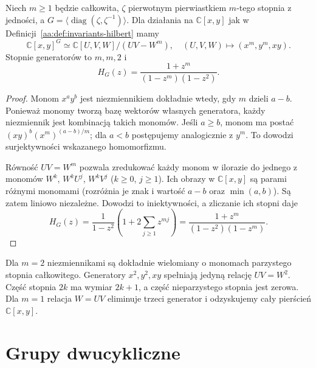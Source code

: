\begin{twierdzenie}
\label{aa:tw:cyclic-invariant-ring}
Niech $m\ge1$ będzie całkowita, $\zeta$ pierwotnym
pierwiastkiem $m$-tego stopnia z jedności, a
$G=\langle\operatorname{diag}(\zeta,\zeta^{-1})\rangle$.
Dla działania na $\mathbb C[x,y]$ jak w
Definicji~\ref{aa:def:invariants-hilbert} mamy
\[
 \mathbb C[x,y]^G\simeq
 \mathbb C[U,V,W]/(UV-W^m),
 \quad (U,V,W)\longmapsto(x^m,y^m,xy).
\]
Stopnie generatorów to $m,m,2$ i
\[
 H_G(z)=\frac{1+z^m}{(1-z^m)(1-z^2)}.
\]
\end{twierdzenie}
\begin{proof}
Monom $x^a y^b$ jest niezmiennikiem dokładnie wtedy,
gdy $m$ dzieli $a-b$. Ponieważ monomy tworzą bazę
wektorów własnych generatora, każdy niezmiennik
jest kombinacją takich monomów. Jeśli $a\ge b$,
monom ma postać $(xy)^b(x^m)^{(a-b)/m}$;
dla $a<b$ postępujemy analogicznie z $y^m$.
To dowodzi surjektywności wskazanego homomorfizmu.

Równość $UV=W^m$ pozwala zredukować każdy monom
w ilorazie do jednego z monomów $W^k$,
$W^kU^j$, $W^kV^j$ ($k\ge0$, $j\ge1$).
Ich obrazy w $\mathbb C[x,y]$ są parami różnymi
monomami (rozróżnia je znak i wartość $a-b$
oraz $\min(a,b)$). Są zatem liniowo niezależne.
Dowodzi to iniektywności, a zliczanie ich stopni daje
\[
 H_G(z)=\frac{1}{1-z^2}
 \left(1+2\sum_{j\ge1}z^{mj}\right)
 =\frac{1+z^m}{(1-z^2)(1-z^m)}.
\]
\end{proof}

\begin{przyklad}
Dla $m=2$ niezmiennikami są dokładnie wielomiany
o monomach parzystego stopnia całkowitego.
Generatory $x^2,y^2,xy$ spełniają jedyną relację
$UV=W^2$. Część stopnia $2k$ ma wymiar $2k+1$,
a część nieparzystego stopnia jest zerowa.
Dla $m=1$ relacja $W=UV$ eliminuje trzeci generator
i odzyskujemy cały pierścień $\mathbb C[x,y]$.
\end{przyklad}

\section{Grupy dwucykliczne}


